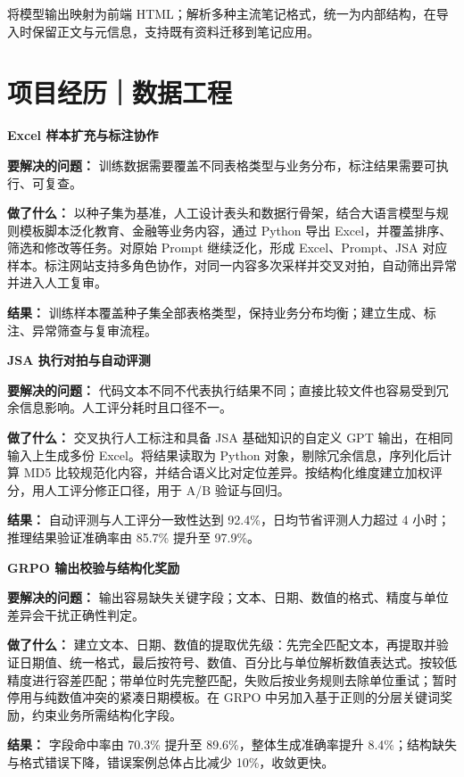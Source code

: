 \documentclass{resume}
\newcommand{\starblock}[4]{%
  \par\vspace{0.55em}%
  {\large\textbf{#1}}\par\vspace{0.12em}%
  \textbf{要解决的问题：}#2\par
  \textbf{做了什么：}#3\par
  \textbf{结果：}#4\par
}
\newcommand{\detailheading}[1]{\par\vspace{0.7em}{\large\textbf{#1}}\par\nopagebreak\vspace{0.2em}}
\begin{document}
\detailheading{笔记格式转换与迁移}
将模型输出映射为前端 HTML；解析多种主流笔记格式，统一为内部结构，在导入时保留正文与元信息，支持既有资料迁移到笔记应用。

\newpage
\section{项目经历｜数据工程}

\starblock{Excel 样本扩充与标注协作}{%
  训练数据需要覆盖不同表格类型与业务分布，标注结果需要可执行、可复查。%
}{%
  以种子集为基准，人工设计表头和数据行骨架，结合大语言模型与规则模板脚本泛化教育、金融等业务内容，通过 Python 导出 Excel，并覆盖排序、筛选和修改等任务。对原始 Prompt 继续泛化，形成 Excel、Prompt、JSA 对应样本。标注网站支持多角色协作，对同一内容多次采样并交叉对拍，自动筛出异常并进入人工复审。%
}{%
  训练样本覆盖种子集全部表格类型，保持业务分布均衡；建立生成、标注、异常筛查与复审流程。%
}

\starblock{JSA 执行对拍与自动评测}{%
  代码文本不同不代表执行结果不同；直接比较文件也容易受到冗余信息影响。人工评分耗时且口径不一。%
}{%
  交叉执行人工标注和具备 JSA 基础知识的自定义 GPT 输出，在相同输入上生成多份 Excel。将结果读取为 Python 对象，剔除冗余信息，序列化后计算 MD5 比较规范化内容，并结合语义比对定位差异。按结构化维度建立加权评分，用人工评分修正口径，用于 A/B 验证与回归。%
}{%
  自动评测与人工评分一致性达到 92.4\%，日均节省评测人力超过 4 小时；推理结果验证准确率由 85.7\% 提升至 97.9\%。%
}

\starblock{GRPO 输出校验与结构化奖励}{%
  输出容易缺失关键字段；文本、日期、数值的格式、精度与单位差异会干扰正确性判定。%
}{%
  建立文本、日期、数值的提取优先级：先完全匹配文本，再提取并验证日期值、统一格式，最后按符号、数值、百分比与单位解析数值表达式。按较低精度进行容差匹配；带单位时先完整匹配，失败后按业务规则去除单位重试；暂时停用与纯数值冲突的紧凑日期模板。在 GRPO 中另加入基于正则的分层关键词奖励，约束业务所需结构化字段。%
}{%
  字段命中率由 70.3\% 提升至 89.6\%，整体生成准确率提升 8.4\%；结构缺失与格式错误下降，错误案例总体占比减少 10\%，收敛更快。%
}
\end{document}

